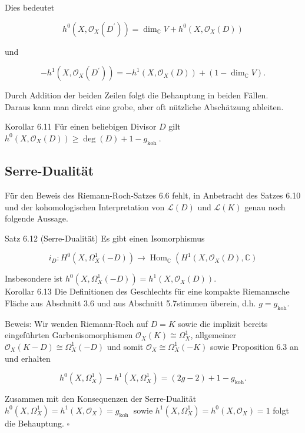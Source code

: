 \documentclass[10pt, letterpaper]{article}
\begin{document}
Dies bedeutet

$$
h^{0}\left(X, \mathcal{O}_{X}\left(D^{\prime}\right)\right)=\operatorname{dim}_{\mathbb{C}} V+h^{0}\left(X, \mathcal{O}_{X}(D)\right)
$$

und

$$
-h^{1}\left(X, \mathcal{O}_{X}\left(D^{\prime}\right)\right)=-h^{1}\left(X, \mathcal{O}_{X}(D)\right)+\left(1-\operatorname{dim}_{\mathbb{C}} V\right) .
$$

Durch Addition der beiden Zeilen folgt die Behauptung in beiden Fällen.\\
Daraus kann man direkt eine grobe, aber oft nützliche Abschätzung ableiten.

Korollar 6.11 Für einen beliebigen Divisor $D$ gilt $h^{0}\left(X, \mathcal{O}_{X}(D)\right) \geq \operatorname{deg}(D)+1- g_{\text {koh }}$.

\subsection {Serre-Dualität}
Für den Beweis des Riemann-Roch-Satzes 6.6 fehlt, in Anbetracht des Satzes 6.10 und der kohomologischen Interpretation von $\mathcal{L}(D)$ und $\mathcal{L}(K)$ genau noch folgende Aussage.

Satz 6.12 (Serre-Dualität) Es gibt einen Isomorphismus

$$
i_{D}: H^{0}\left(X, \Omega_{X}^{1}(-D)\right) \rightarrow \operatorname{Hom}_{\mathbb{C}}\left(H^{1}\left(X, \mathcal{O}_{X}(D), \mathbb{C}\right)\right.
$$

Insbesondere ist $h^{0}\left(X, \Omega_{X}^{1}(-D)\right)=h^{1}\left(X, \mathcal{O}_{X}(D)\right)$.\\
Korollar 6.13 Die Definitionen des Geschlechts für eine kompakte Riemannsche Fläche aus Abschnitt 3.6 und aus Abschnitt 5.7stimmen überein, d.h. $g=g_{\mathrm{koh}}$.

Beweis: Wir wenden Riemann-Roch auf $D=K$ sowie die implizit bereits eingeführten Garbenisomorphismen $\mathcal{O}_{X}(K) \cong \Omega_{X}^{1}$, allgemeiner $\mathcal{O}_{X}(K-D) \cong \Omega_{X}^{1}(-D)$ und somit $\mathcal{O}_{X} \cong \Omega_{X}^{1}(-K)$ sowie Proposition 6.3 an und erhalten

$$
h^{0}\left(X, \Omega_{X}^{1}\right)-h^{1}\left(X, \Omega_{X}^{1}\right)=(2 g-2)+1-g_{\mathrm{koh}} .
$$

Zusammen mit den Konsequenzen der Serre-Dualität $h^{0}\left(X, \Omega_{X}^{1}\right)= h^{1}\left(X, \mathcal{O}_{X}\right)=g_{\text {koh }}$ sowie $h^{1}\left(X, \Omega_{X}^{1}\right)=h^{0}\left(X, \mathcal{O}_{X}\right)=1$ folgt die Behauptung. \(\square\)
\end{document}
